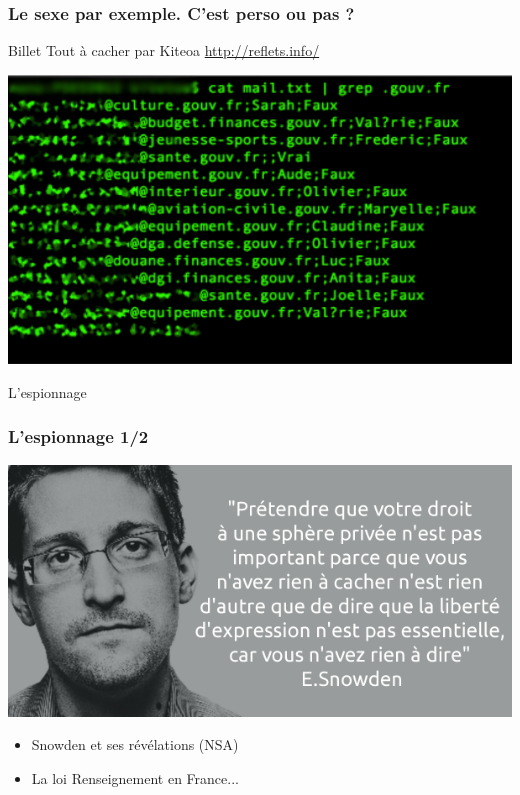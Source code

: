 \documentclass{beamer}
\begin{document}
\begin{frame}
\frametitle{Le sexe par exemple. C’est perso ou pas ?}

\begin{block}{Billet Tout à cacher par Kiteoa \url{http://reflets.info/}}
\begin{itemize}
\end{itemize}
\end{block}
\begin{center}
\includegraphics[scale=1]{./images/lesexshopquivamal.png}
\end{center}
\end{frame}

\begin{frame}
\Huge{\centerline{L'espionnage}}
\end{frame}

\begin{frame}
\frametitle{L'espionnage 1/2}
\begin{center}
\includegraphics[scale=0.4]{./images/snowden.png}
\end{center}
\begin{itemize}
\item Snowden et ses révélations (NSA)
\item La loi Renseignement en France...
\end{itemize}
\end{frame}
\end{document}
